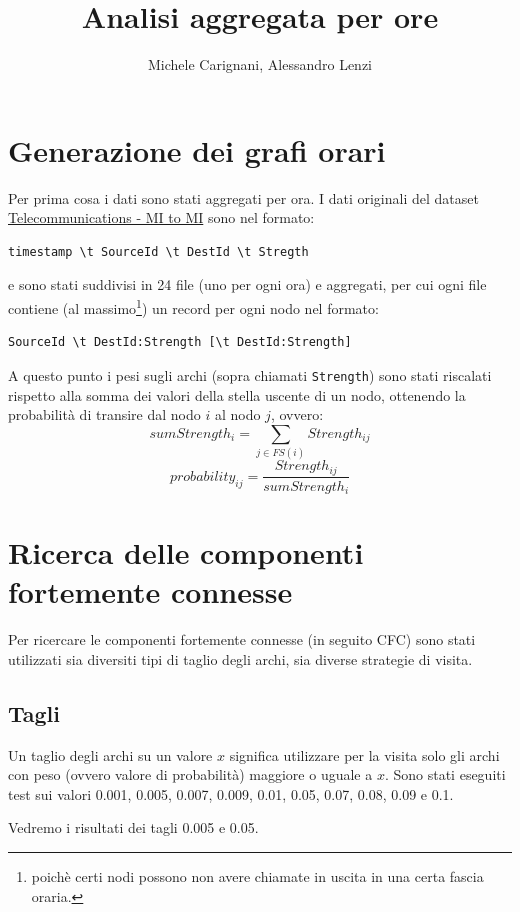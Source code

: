 \documentclass[10pt,a4paper]{article}
\author{Michele Carignani, Alessandro Lenzi}
\title{Analisi aggregata per ore}
\begin{document}
\maketitle

\section{Generazione dei grafi orari}

Per prima cosa i dati sono stati aggregati per ora. I dati originali del dataset 
\href{https://dandelion.eu/datagem/telecom-mi-to-mi/description/}{Telecommunications - MI to MI} sono nel formato:
\begin{verbatim}
timestamp \t SourceId \t DestId \t Stregth
\end{verbatim}
e sono stati suddivisi in 24 file (uno per ogni ora) e aggregati, per cui
ogni file contiene (al massimo\footnote{poichè certi nodi possono non avere chiamate in uscita
in una certa fascia oraria.}) un record per ogni nodo nel formato:
\begin{verbatim}
SourceId \t DestId:Strength [\t DestId:Strength]
\end{verbatim}

A questo punto i pesi sugli archi (sopra chiamati \verb!Strength!) sono stati riscalati rispetto alla somma
dei valori della stella uscente di un nodo, ottenendo la probabilità di transire dal nodo $i$ al 
nodo $j$, ovvero:
$$ sumStrength_i = \sum_{j \in FS(i)} Strength_{ij} $$
$$ probability_{ij} = \frac{Strength_{ij}}{sumStrength_i} $$

\section{Ricerca delle componenti fortemente connesse}

Per ricercare le componenti fortemente connesse (in seguito CFC) sono stati utilizzati sia diversiti tipi di taglio degli archi, sia diverse strategie di visita.

\subsection{Tagli}
Un taglio degli archi su un valore $x$ significa utilizzare per la visita solo gli archi con peso (ovvero valore di probabilità) maggiore o uguale a $x$. Sono stati eseguiti test sui valori 0.001, 0.005, 0.007, 0.009, 0.01, 0.05,
0.07, 0.08, 0.09 e 0.1.

Vedremo i risultati dei tagli 0.005 e 0.05.
\end{document}
